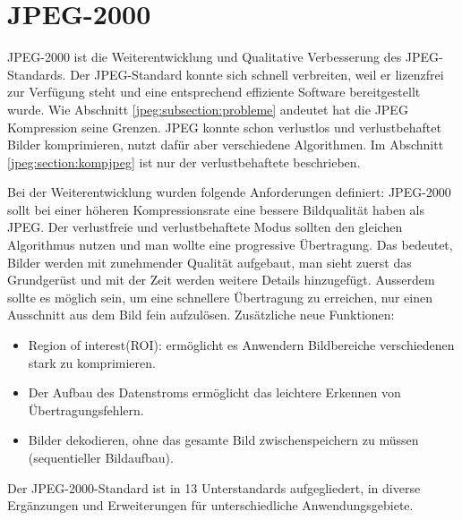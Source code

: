 %
%
%
%
\section{JPEG-2000 
\label{jpeg:section:jpeg2000}}
JPEG-2000 ist die Weiterentwicklung und Qualitative Verbesserung des JPEG-Standards.
Der JPEG-Standard konnte sich schnell verbreiten, weil er lizenzfrei zur Verfügung steht und eine entsprechend effiziente Software bereitgestellt wurde.
Wie Abschnitt \ref{jpeg:subsection:probleme} andeutet hat die JPEG Kompression seine Grenzen.
JPEG konnte schon verlustlos und verlustbehaftet Bilder komprimieren, nutzt dafür aber verschiedene Algorithmen.
Im Abschnitt \ref{jpeg:section:kompjpeg} ist nur der verlustbehaftete beschrieben.

Bei der Weiterentwicklung wurden folgende Anforderungen definiert:
JPEG-2000 sollt bei einer höheren Kompressionsrate eine bessere Bildqualität haben als JPEG.
Der verlustfreie und verlustbehaftete Modus sollten den gleichen Algorithmus nutzen und man wollte eine progressive Übertragung.
Das bedeutet, Bilder werden mit zunehmender Qualität aufgebaut, man sieht zuerst das Grundgerüst und mit der Zeit werden weitere Details hinzugefügt.
Ausserdem sollte es möglich sein, um eine schnellere Übertragung zu erreichen, nur einen Ausschnitt aus dem Bild fein aufzulösen.
Zusätzliche neue Funktionen:
\begin{itemize}
    \item Region of interest(ROI): ermöglicht es Anwendern Bildbereiche verschiedenen stark zu komprimieren.
    \item Der Aufbau des Datenstroms ermöglicht das leichtere Erkennen von Übertragungsfehlern.
    \item Bilder dekodieren, ohne das gesamte Bild zwischenspeichern zu müssen (sequentieller Bildaufbau).
\end{itemize}
Der JPEG-2000-Standard ist in 13 Unterstandards aufgegliedert, in diverse Ergänzungen und Erweiterungen für unterschiedliche Anwendungsgebiete. 


